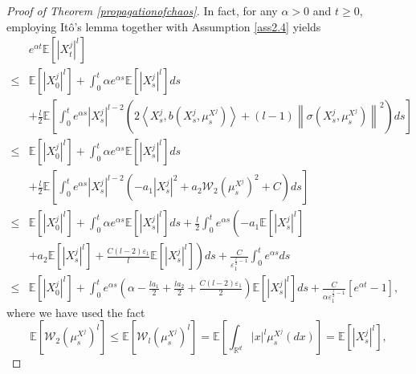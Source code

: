 \documentclass[12pt]{article}
\numberwithin{equation}{section}
\begin{document}
\begin{proof}[Proof of Theorem \ref{propagationofchaos}]
In fact, for any $\alpha>0$ and $t\geq 0$, employing It{\^o}'s lemma together with Assumption \ref{ass2.4}  yields
\begin{equation}\tag{5.11}\label{3.18}
\begin{aligned}
& e^{\alpha  t} \mathbb{E}\left[\left|X_t^j\right|^{l}\right] \\
\leq & \mathbb{E}\left[\left|X_0^j\right|^{l}\right]+\int_0^t \alpha  e^{\alpha s} \mathbb{E}\left[\left|X_s^j\right|^{l}\right] d s \\
& +\tfrac{l}{2} \mathbb{E}\left[\int_0^t e^{\alpha  s}\left|X_s^j\right|^{{l} -2}\left(2\left\langle X_s^j, b\left(X_s^j, \mu_s^{X^j}\right)\right\rangle+\left({l}-1\right)\left\|\sigma\left(X_s^j, \mu_s^{X^j}\right)\right\|^2\right) d s\right] \\
\leq & \mathbb{E}\left[\left|X_0^j\right|^{l}\right]+\int_0^t \alpha  e^{\alpha  s} \mathbb{E}\left[\left|X_s^j\right|^{l}\right] d s \\
& +\tfrac{{l}}{2} \mathbb{E}\left[\int_0^t e^{\alpha  s}\left|X_s^j\right|^{{l}-2}\left(-a_1\left|X_s^j\right|^2+a_2 \mathcal{W}_2\left(\mu_s^{X^j}\right)^2+C\right) d s\right] \\
\leq & \mathbb{E}\left[\left|X_0^j\right|^{l}\right]+\int_0^t \alpha e^{\alpha s} \mathbb{E}\left[\left|X_s^j\right|^{l}\right] d s+\tfrac{{l}}{2} \int_0^t e^{\alpha s}\left(-a_1 \mathbb{E}\left[\left|X_s^j\right|^{l}\right]\right.\\
&\left. +a_2 \mathbb{E}\left[\left|X_s^j\right|^{l}\right]+\tfrac{C\left({l}-2\right)\varepsilon_{1}}{{l}} \mathbb{E}\left[\left|X_s^j\right|^{l}\right]\right) d s+ \tfrac{C}{ \varepsilon ^{\frac{l}{2}-1}_{1}}\int_0^t e^{\alpha s} d s\\
\leq & \mathbb{E}\left[\left|X_0^j\right|^{l}\right]+\int_0^t e^{\alpha s}\left(\alpha-\tfrac{{l} a_1}{2}+\tfrac{{l} a_2}{2}+\tfrac{C\left({l}-2\right)\varepsilon_{1}}{2}\right) \mathbb{E}\left[\left|X_s^j\right|^{l} \right]d s+ \tfrac{C}{\alpha \varepsilon ^{\frac{l}{2}-1}_{1}}\left[e^{\alpha t}-1\right] ,
\end{aligned}
\end{equation}
where we have used the fact
\begin{equation}\tag{5.12}\label{3.19}
\mathbb{E}\left[ \mathcal{W}_2\left( \mu _{s}^{X^j} \right) ^{l} \right] \leq \mathbb{E}\left[ \mathcal{W}_{l}\left( \mu _{s}^{X^j} \right) ^{l} \right] =\mathbb{E}\left[ \int_{\mathbb{R} ^d}{\left|x\right|^{l}\mu _{s}^{X^j}\left( dx \right)} \right] =\mathbb{E}\left[ \left|X_{s}^{j}\right|^{l} \right] ,
\end{equation}

\end{proof}
\end{document}
